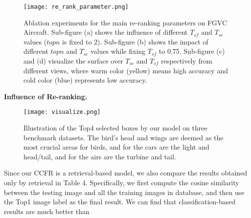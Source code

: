 \documentclass[10pt,twocolumn,letterpaper]{article}
\begin{document}
\begin{figure}[t]
\begin{center}
\texttt{[image: re\_rank\_parameter.png]}
\end{center}
   \caption{Ablation experiments for the main re-ranking parameters on FGVC Aircraft. Sub-figure (a) shows the influence of different $T_{sf}$ and $T_{sc}$ values ($topn$ is fixed to 2). Sub-figure (b) shows the impact of different $topn$ and $T_{sc}$ values while fixing $T_{sf}$ to 0.75.
   Sub-figure (c) and (d) visualize the surface over $T_{sc}$ and $T_{sf}$ respectively from different views, where warm color (yellow) means high accuracy and cold color (blue) represents low accuracy.
   }
\label{re_ranking_param}
\end{figure}


\textbf{Influence of Re-ranking.}\begin{figure*}[t]
\begin{center}
\texttt{[image: visualize.png]}
\end{center}
   \caption{Illustration of the Top4 selected boxes by our model on three benchmark datasets. The bird's head and wings are deemed as the most crucial areas for birds, and for the cars are the light and head/tail, and for the airs are the turbine and tail.}
\label{visualize}
\end{figure*}
Since our CCFR is a retrieval-based model, we also compare the results obtained only by retrieval in Table 4. Specifically, we first compute the cosine similarity between the testing image and all the training images in database, and then use the Top1 image label as the final result. We can find that classification-based results are much better than
\end{document}
